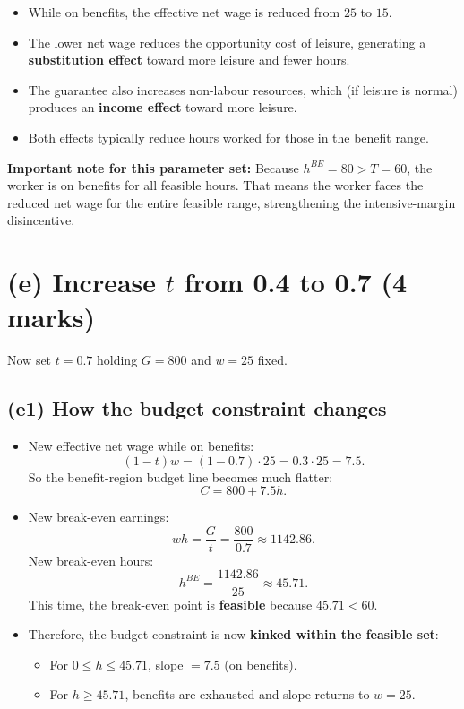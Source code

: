 \documentclass[12pt]{article}
\begin{document}
\begin{itemize}
\item While on benefits, the effective net wage is reduced from $25$ to $15$.
\item The lower net wage reduces the opportunity cost of leisure, generating a \textbf{substitution effect} toward more leisure and fewer hours.
\item The guarantee also increases non-labour resources, which (if leisure is normal) produces an \textbf{income effect} toward more leisure.
\item Both effects typically reduce hours worked for those in the benefit range.
\end{itemize}

\textbf{Important note for this parameter set:} Because $h^{BE}=80>T=60$, the worker is on benefits for all feasible hours. That means the worker faces the reduced net wage for the entire feasible range, strengthening the intensive-margin disincentive.

\section*{(e) Increase $t$ from 0.4 to 0.7 (4 marks)}

Now set $t=0.7$ holding $G=800$ and $w=25$ fixed.

\subsection*{(e1) How the budget constraint changes}

\begin{itemize}
\item New effective net wage while on benefits:
\[
(1-t)w = (1-0.7)\cdot 25 = 0.3\cdot 25 = 7.5.
\]
So the benefit-region budget line becomes much flatter:
\[
C = 800 + 7.5h.
\]

\item New break-even earnings:
\[
wh = \frac{G}{t} = \frac{800}{0.7} \approx 1142.86.
\]
New break-even hours:
\[
h^{BE} = \frac{1142.86}{25} \approx 45.71.
\]
This time, the break-even point is \textbf{feasible} because $45.71 < 60$.

\item Therefore, the budget constraint is now \textbf{kinked within the feasible set}:
\begin{itemize}
\item For $0 \le h \le 45.71$, slope $=7.5$ (on benefits).
\item For $h \ge 45.71$, benefits are exhausted and slope returns to $w=25$.
\end{itemize}
\end{itemize}
\end{document}
